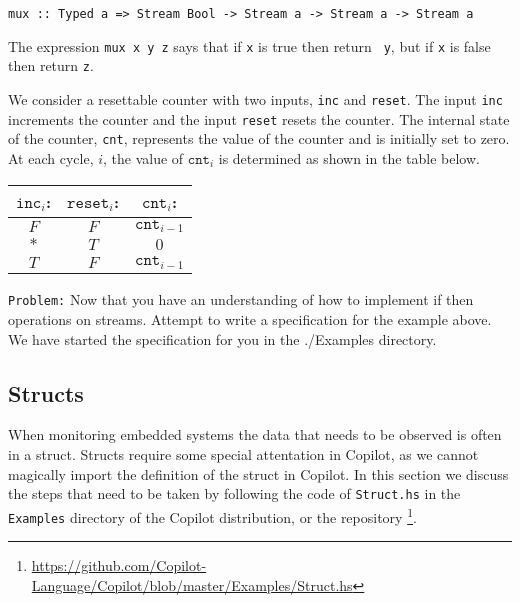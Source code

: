 %
\begin{lstlisting}[language = Copilot, frame = single]
mux :: Typed a => Stream Bool -> Stream a -> Stream a -> Stream a
\end{lstlisting}
%

The expression {\tt mux x y z} says that if {\tt x} is true then return {\tt
y}, but if {\tt x} is false then return {\tt z}.

\begin{example} We consider a resettable counter with two inputs, {\tt inc} and
{\tt reset}.
%
The input {\tt inc} increments the counter and the input {\tt reset} resets the
counter.
%
The internal state of the counter, {\tt cnt}, represents the value of the
counter and is initially set to zero. 
%
At each cycle, $i$, the value of $\mathtt{cnt}_i$ is determined as shown in the
table below.

\begin{center}
\begin{minipage}{0.25\linewidth}
\begin{tabular}{c|c||c}
$\mathtt{inc}_i$: & $\mathtt{reset}_i$: & $\mathtt{cnt}_i$:\\
\hline
$F$ & $F$ & $\mathtt{cnt}_{i-1}$ \\
\hline
$*$ & $T$ & $0$ \\
\hline
$T$ & $F$ & $\mathtt{cnt}_{i-1}$\\
\hline
\end{tabular}
\end{minipage}
\end{center}
\end{example}

{\tt Problem:} Now that you have an understanding of how to implement if then operations on streams.
%
Attempt to write a specification for the example above.
%
We have started the specification for you in the ./Examples directory.




\subsection{Structs}
When monitoring embedded systems the data that needs to be observed is often in a struct.
Structs require some special attentation in Copilot, as we cannot magically
import the definition of the struct in Copilot. In this section we discuss the
steps that need to be taken by following the code of \texttt{Struct.hs} in the
\texttt{Examples} directory of the Copilot distribution, or the repository
\footnote{\url{https://github.com/Copilot-Language/Copilot/blob/master/Examples/Struct.hs}}.

